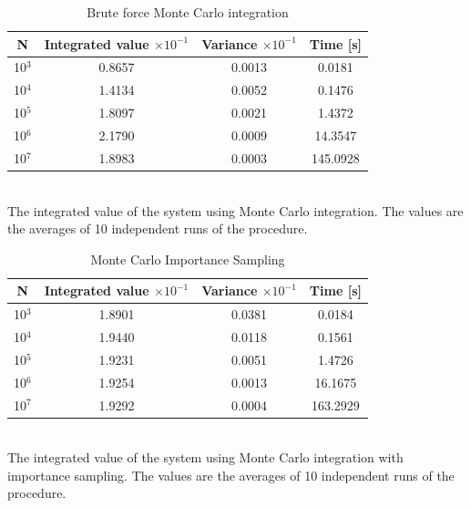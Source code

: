 \documentclass[%
reprint,
amsmath,amssymb,
aps,
]{revtex4-1}
\begin{document}
\begin{table}[!h]
	\caption{Brute force Monte Carlo integration}
	\begin{tabular}{|c|c|c|c|}
		\hline 
		\hspace{5mm} \textbf{N} \hspace{5mm} & \textbf{Integrated value} $\times 10^{-1}$& \hspace{3mm} \textbf{Variance} $\times 10^{-1}$ & \hspace{3mm} \textbf{Time  [s]} \hspace{5mm}\\
		\hline 
			10$^3$ & 0.8657  & 0.0013  & 0.0181 \\
			10$^4$  & 1.4134  & 0.0052  & 0.1476 \\
			10$^5$  & 1.8097  & 0.0021  & 1.4372 \\
			10$^6$  & 2.1790  & 0.0009  & 14.3547 \\
			10$^7$  & 1.8983  & 0.0003  & 145.0928 \\
		\hline 
	\end{tabular} \\ [3pt]
	\label{mc_values} \centering The integrated value of the system using Monte Carlo integration. The values are the averages of 10 independent runs of the procedure. 
\end{table}


\begin{table}[!h]
	\caption{Monte Carlo Importance Sampling}
	\begin{tabular}{|c|c|c|c|}
		\hline 
		\hspace{5mm} \textbf{N} \hspace{5mm} & \textbf{Integrated value} $\times 10^{-1}$& \hspace{3mm} \textbf{Variance}  $\times 10^{-1}$& \hspace{3mm} \textbf{Time  [s]} \hspace{5mm}\\
		\hline 
			10$^3$ & 1.8901  & 0.0381  & 0.0184 \\
			10$^4$ & 1.9440  & 0.0118  & 0.1561 \\
			10$^5$ & 1.9231  & 0.0051  & 1.4726 \\
			10$^6$ & 1.9254  & 0.0013  & 16.1675 \\
			10$^7$ & 1.9292  & 0.0004  & 163.2929 \\

		\hline 
	\end{tabular} \\ 
	[3pt]\label{mc_values_is} \centering The integrated value of the system using Monte Carlo integration with importance sampling. The values are the averages of 10 independent runs of the procedure.
\end{table}
\end{document}
